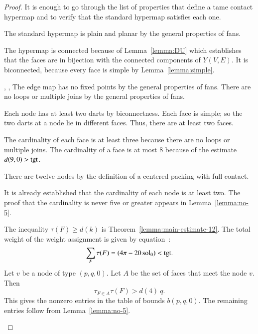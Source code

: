 \begin{proof}  It is enough to go through the list of properties that define a tame contact hypermap and to verify that the standard hypermap satisfies each one.

\begin{nomerate}
\item {} The standard hypermap is plain and planar by the general properties of fans.
\item {} The hypermap is connected because of Lemma~\ref{lemma:DU} which establishes that the faces are in bijection with the connected components of $Y(V,E)$.  It is biconnected, because every face is simple by Lemma~\ref{lemma:simple}.
%
\item {}, ,  The edge map has no fixed points by the general properties of fans.  There are no loops or multiple joins by the general properties of fans.
\item  {} Each node has at least two darts by biconnectness. Each face is simple; so the two darts at a node lie in different faces.  Thus, there are at least two faces.
\item {} The cardinality of each face is at least three because there are no loops or multiple joins.  The cardinality of a face is at most $8$ because of the estimate $d(9,0)>{\operatorname{tgt}}$.  
\item {} There are twelve nodes by the definition of a centered packing with full contact.
\item {} It is already established that the cardinality of each node is at least two.  The proof that the cardinality is never five or greater appears in Lemma~\ref{lemma:no-5}.
\item {} The inequality $\tau(F)\ge d(k)$ is Theorem~\ref{lemma:main-estimate-12}.
%
The total weight of the weight assignment is given by equation~:
$$
\sum_F \tau(F) = (4\pi - 20\operatorname{sol}_0) < {\operatorname{tgt}}.
$$
%
Let $v$ be a node of type $(p,q,0)$.  Let $A$ be the set of faces that meet the node $v$. Then 
$$
\tau_{F\in A}\tau(F) > d(4)~q.
$$
This gives the nonzero entries in the table of bounds $b(p,q,0)$.  The remaining entries follow from Lemma~\ref{lemma:no-5}.
\end{nomerate}
\end{proof}




